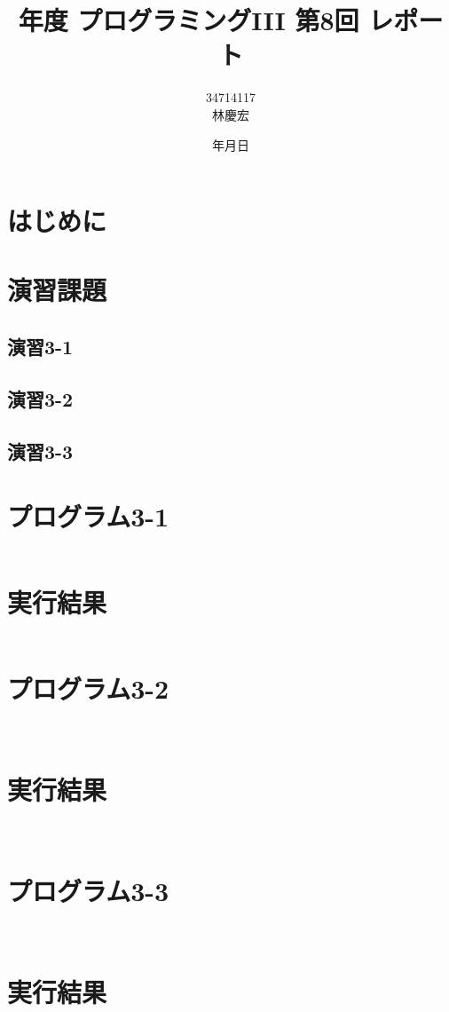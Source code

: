 \documentclass[a4j,11pt]{jarticle}
\title{{\thisyear}年度 プログラミングIII 第8回 レポート}
\date{\the\year 年\the\month 月\the\day 日}
\author{34714117 \\ 林慶宏}
\begin{document}
\maketitle
\clearpage

\section{はじめに}
\section{演習課題}
\subsection{演習3-1}

\subsection{演習3-2}

\subsection{演習3-3}

\section{プログラム3-1}
\begin{verbatim}

\end{verbatim}
\section{実行結果}
\begin{verbatim}

\end{verbatim}
\section{プログラム3-2}
\begin{verbatim}
    
\end{verbatim}
\section{実行結果}
\begin{verbatim}
    
\end{verbatim}
\section{プログラム3-3}
\begin{verbatim}
  
\end{verbatim}
\section{実行結果}
\begin{verbatim}

\end{verbatim}
\end{document}
